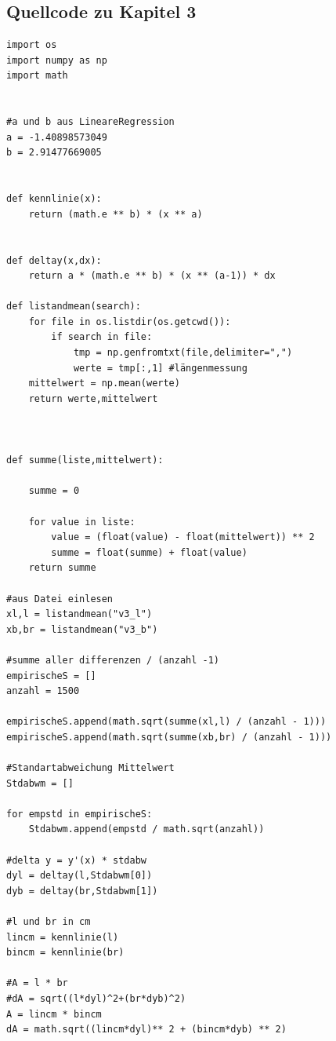 \documentclass[12pt,oneside,a4paper]{report}
\begin{document}
\subsection{Quellcode zu Kapitel 3}
\label{chap:APPENDIX_SOURCECODE_V3}
\begin{lstlisting}[style=PYTHON,frame=single,
 caption=Din A4 messen Fehler bestimmen Fläche berechnen,
 captionpos=b,
 label=lst:FLAECHENBERECHNUNG]
import os
import numpy as np
import math


#a und b aus LineareRegression
a = -1.40898573049
b = 2.91477669005


def kennlinie(x):
    return (math.e ** b) * (x ** a)


def deltay(x,dx):
    return a * (math.e ** b) * (x ** (a-1)) * dx

def listandmean(search):
    for file in os.listdir(os.getcwd()):
        if search in file:
            tmp = np.genfromtxt(file,delimiter=",") 
            werte = tmp[:,1] #längenmessung
    mittelwert = np.mean(werte)
    return werte,mittelwert



def summe(liste,mittelwert):

    summe = 0

    for value in liste:
        value = (float(value) - float(mittelwert)) ** 2
        summe = float(summe) + float(value)
    return summe
    
#aus Datei einlesen
xl,l = listandmean("v3_l")
xb,br = listandmean("v3_b")

#summe aller differenzen / (anzahl -1)
empirischeS = []
anzahl = 1500

empirischeS.append(math.sqrt(summe(xl,l) / (anzahl - 1)))
empirischeS.append(math.sqrt(summe(xb,br) / (anzahl - 1)))

#Standartabweichung Mittelwert 
Stdabwm = []

for empstd in empirischeS:    
    Stdabwm.append(empstd / math.sqrt(anzahl)) 

#delta y = y'(x) * stdabw
dyl = deltay(l,Stdabwm[0])
dyb = deltay(br,Stdabwm[1])

#l und br in cm
lincm = kennlinie(l)
bincm = kennlinie(br)

#A = l * br
#dA = sqrt((l*dyl)^2+(br*dyb)^2)
A = lincm * bincm
dA = math.sqrt((lincm*dyl)** 2 + (bincm*dyb) ** 2)
\end{lstlisting}

\newpage
\end{document}
